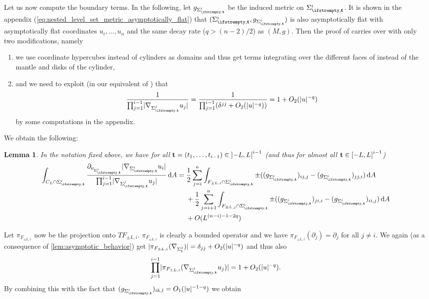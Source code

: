 \documentclass[draft]{amsart}
\newtheorem{lemma}[theorem]{Lemma}
\newcommand*{\mathfullstop}{.}
\DeclarePairedDelimiter{\abs}{\lvert}{\rvert} %
\begin{document}
Let us now compute the boundary terms. In the following, let \( g_{\nls^i} \) be the induced metric on \( \nls^i \). It is shown in the appendix (\cref{eq:nested_level_set_metric_asymptotically_flat}) that \( (\nls^i,g_{\nls^i}) \) is also asymptotically flat with asymptotically flat coordinates \( u_{i},\dotsc,u_n \) and the same decay rate (\( q>(n-2)/2 \)) as \( (M,g) \). Then the proof of \cite[Lemma 6.1]{brayHarmonicFunctionsMass2019} carries over with only two modifications, namely
\begin{enumerate}
    \item we use coordinate hypercubes instead of cylinders as domains and thus get terms integrating over the different faces of instead of the mantle and disks of the cylinder,
    \item and we need to exploit (in our equivalent of \cite[Equation 6.8]{brayHarmonicFunctionsMass2019}) that
    \begin{equation}\label{eq:boundary_norms_factor_asymptotically_1}
        \frac{1}{\prod_{j=1}^{i-1}\abs{\nabla_{\nls^j}u_j}}=\frac{1}{\prod_{j=1}^{i-1}(\delta^{jj}+O_2(\abs{u}^{-q}))}=1+O_2(\abs{u}^{-q})
    \end{equation}
    by some computations in the appendix.
\end{enumerate}
We obtain the following:
\begin{lemma}
    In the notation fixed above, we have for all \( \vect{t}=(t_1,\dotsc,t_{i-1})\in \ointerval{-L}{L}^{i-1} \) (and thus for almost all \( \vect{t}\in \interval{-L}{L}^{i-1} \))
    \begin{equation*}
        \int_{C_L\cap \nls^i}\frac{\partial_{\nu_{\nls^i}}\abs{\nabla_{\nls^i}u_i}}{\prod_{j=1}^{i-1}\abs{\nabla_{\nls^j}u_j}}\odif{A}=\begin{aligned}[t]
            &\frac{1}{2}\sum_{j=i}^n \int_{F_{\pm L,i}\cap \nls^i} \pm((g_{\nls^i})_{ij,j}-(g_{\nls^i})_{jj,i})\odif{A}\\
            &{}+\frac{1}{2}\sum_{j=i+1}^n \int_{F_{\pm L,j}\cap \nls^i}\pm((g_{\nls^i})_{ji,i}-(g_{\nls^i})_{ii,j})\odif{A}\\
            &{}+O(L^{(n-i)-1-2q})
        \end{aligned}
    \end{equation*}
\end{lemma}
Let \( \pi_{F_{\pm L,i}} \) now be the projection onto \( TF_{\pm L,i} \). \( \pi_{F_{\pm L,i}} \) is clearly a bounded operator and we have \( \pi_{F_{\pm L,i}}(\partial_j)=\partial_j \) for all \( j\neq i \). We again (as a consequence of \cref{lem:asymptotic_behavior}) get \(\abs{ \pi_{F_{\pm L,i}}(\nabla_{\Sigma_t^j})}=\delta_{jj}+O_2(\abs{u}^{-q}) \) and thus also
\begin{equation*}
    \prod_{j=1}^{i-1}\abs{\pi_{F_{\pm L,i}}(\nabla_{\nls^j}u_j)}=1+O_2(\abs{u}^{-q})\mathfullstop
\end{equation*}
By combining this with the fact that \( (g_{\nls^i})_{ik,l}=O_1(\abs{u}^{-1-q}) \) we obtain
\end{document}
